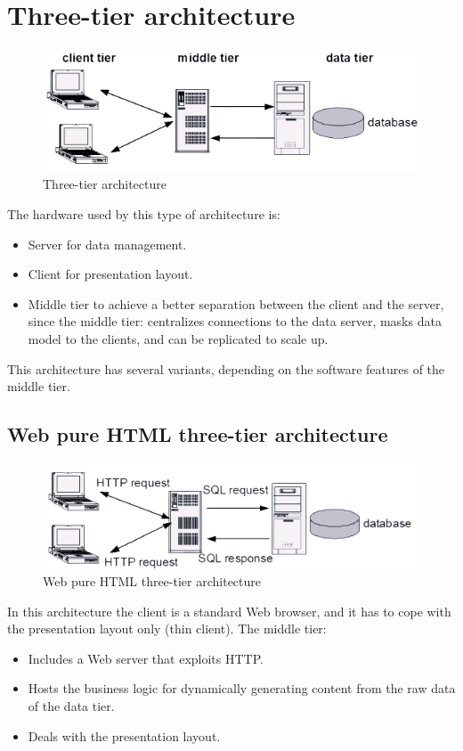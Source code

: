 \documentclass[12pt, a4paper]{report}
\newtheorem[style=M,bodystyle=\normalfont]{theorem}{Theorem}
\newtheorem[style=M,bodystyle=\normalfont]{corollary}{Corollary}
\newtheorem[style=M,bodystyle=\normalfont]{lemma}{Lemma}
\newtheorem[style=M,bodystyle=\normalfont]{definition}{Definition}
\begin{document}
    \section{Three-tier architecture}
    \begin{figure}[H]
        \centering
        \includegraphics[width=0.5\linewidth]{images/tt.png}
        \caption{Three-tier architecture}
    \end{figure}
    The hardware used by this type of architecture is: 
    \begin{itemize}
        \item Server for data management. 
        \item Client for presentation layout. 
        \item Middle tier to achieve a better separation between the client and the server, since the middle tier: centralizes connections to the data server, masks data 
            model to the clients, and can be replicated to scale up. 
    \end{itemize}
    This architecture has several variants, depending on the software features of the middle tier. 
    
    \subsection{Web pure HTML three-tier architecture}
    \begin{figure}[H]
        \centering
        \includegraphics[width=0.5\linewidth]{images/ttph.png}
        \caption{Web pure HTML three-tier architecture}
    \end{figure}
    In this architecture the client is a standard Web browser, and it has to cope with the presentation layout only (thin client). The middle tier: 
    \begin{itemize}
        \item Includes a Web server that exploits HTTP.
        \item Hosts the business logic for dynamically generating content from the raw data of the data tier. 
        \item Deals with the presentation layout. 
    \end{itemize}
\end{document}
